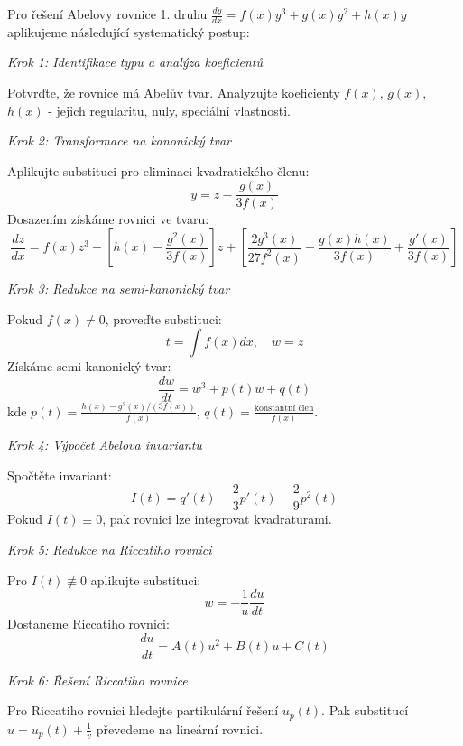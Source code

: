 Pro řešení Abelovy rovnice 1. druhu $\frac{dy}{dx} = f(x)y^3 + g(x)y^2 + h(x)y$ aplikujeme následující systematický postup:

\vspace{1\baselineskip}

\noindent\textit{Krok 1: Identifikace typu a analýza koeficientů}

Potvrďte, že rovnice má Abelův tvar. Analyzujte koeficienty $f(x)$, $g(x)$, $h(x)$ - jejich regularitu, nuly, speciální vlastnosti.

\vspace{1\baselineskip}

\noindent\textit{Krok 2: Transformace na kanonický tvar}

Aplikujte substituci pro eliminaci kvadratického členu:
\[
y = z - \frac{g(x)}{3f(x)}
\]
Dosazením získáme rovnici ve tvaru:
\[
\frac{dz}{dx} = f(x)z^3 + \left[h(x) - \frac{g^2(x)}{3f(x)}\right]z + \left[\frac{2g^3(x)}{27f^2(x)} - \frac{g(x)h(x)}{3f(x)} + \frac{g'(x)}{3f(x)}\right]
\]

\vspace{1\baselineskip}

\noindent\textit{Krok 3: Redukce na semi-kanonický tvar}

Pokud $f(x) \neq 0$, proveďte substituci:
\[
t = \int f(x)dx, \quad w = z
\]
Získáme semi-kanonický tvar:
\[
\frac{dw}{dt} = w^3 + p(t)w + q(t)
\]
kde $p(t) = \frac{h(x) - g^2(x)/(3f(x))}{f(x)}$, $q(t) = \frac{\text{konstantní člen}}{f(x)}$.

\vspace{1\baselineskip}

\noindent\textit{Krok 4: Výpočet Abelova invariantu}

Spočtěte invariant:
\[
I(t) = q'(t) - \frac{2}{3}p'(t) - \frac{2}{9}p^2(t)
\]
Pokud $I(t) \equiv 0$, pak rovnici lze integrovat kvadraturami.

\vspace{1\baselineskip}

\noindent\textit{Krok 5: Redukce na Riccatiho rovnici}

Pro $I(t) \not\equiv 0$ aplikujte substituci:
\[
w = -\frac{1}{u}\frac{du}{dt}
\]
Dostaneme Riccatiho rovnici:
\[
\frac{du}{dt} = A(t)u^2 + B(t)u + C(t)
\]

\vspace{1\baselineskip}

\noindent\textit{Krok 6: Řešení Riccatiho rovnice}

Pro Riccatiho rovnici hledejte partikulární řešení $u_p(t)$. Pak substitucí $u = u_p(t) + \frac{1}{v}$ převedeme na lineární rovnici.

